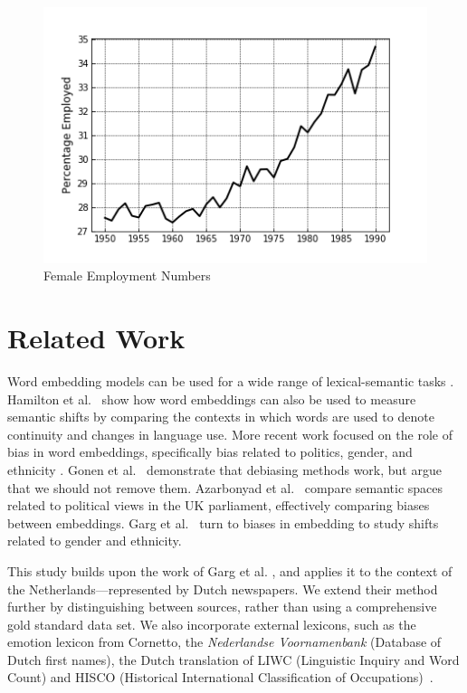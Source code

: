 \documentclass[11pt,a4paper]{article}
\begin{document}
\begin{figure}
  \includegraphics[width=\linewidth]{figures/female_employment}
  \caption{Female Employment Numbers}
  \label{fig:female_employment}
\end{figure}

\section{Related Work}
Word embedding models can be used for a wide range of lexical-semantic tasks \cite{baroni2014don, kulkarni_statistically_2015}. Hamilton et al.~ show how word embeddings can also be used to measure semantic shifts by comparing the contexts in which words are used to denote continuity and changes in language use. More recent work focused on the role of bias in word embeddings, specifically bias related to politics, gender, and ethnicity \cite{azarbonyad_words_2017, bolukbasi_quantifying_2016, garg_word_2018}. Gonen et al.~ demonstrate that debiasing methods work, but argue that we should not remove them. Azarbonyad et al.~ compare semantic spaces related to political views in the UK parliament, effectively comparing biases between embeddings. Garg et al.~ turn to biases in embedding to study shifts related to gender and ethnicity.
 
This study builds upon the work of Garg et al. , and applies it to the context of the Netherlands---represented by Dutch newspapers. We extend their method further by distinguishing between sources, rather than using a comprehensive gold standard data set. We also incorporate external lexicons, such as the emotion lexicon from Cornetto, the \textit{Nederlandse Voornamenbank} (Database of Dutch first names), the Dutch translation of LIWC (Linguistic Inquiry and Word Count) and HISCO (Historical International Classification of Occupations)~\cite{vossen_cornetto_2007, tausczik2010psychological, zijlstra2004nederlandse, zijdeman_hsn_2013, bloothooft_nederlandse_2010}.
\end{document}
